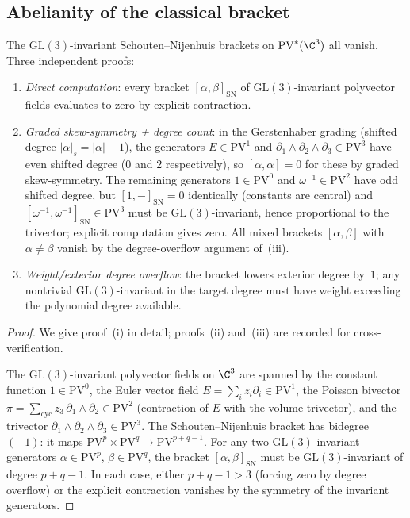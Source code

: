 \subsection{Abelianity of the classical bracket}
\label{subsec:abelian-bracket}

\begin{theorem}
\label{thm:c3-abelian-bracket}
The $\mathrm{GL}(3)$-invariant Schouten--Nijenhuis brackets on $\mathrm{PV}^*(\C^3)$ all vanish. Three independent proofs:
\begin{enumerate}[label=\textup{(\roman*)}]
 \item \emph{Direct computation}: every bracket $[\alpha, \beta]_{\mathrm{SN}}$ of $\mathrm{GL}(3)$-invariant polyvector fields evaluates to zero by explicit contraction.
 \item \emph{Graded skew-symmetry + degree count}: in the Gerstenhaber grading (shifted degree $|\alpha|_s = |\alpha| - 1$), the generators $E \in \mathrm{PV}^1$ and $\partial_1 \wedge \partial_2 \wedge \partial_3 \in \mathrm{PV}^3$ have even shifted degree ($0$ and $2$ respectively), so $[\alpha, \alpha] = 0$ for these by graded skew-symmetry. The remaining generators $1 \in \mathrm{PV}^0$ and $\omega^{-1} \in \mathrm{PV}^2$ have odd shifted degree, but $[1, -]_{\mathrm{SN}} = 0$ identically (constants are central) and $[\omega^{-1}, \omega^{-1}]_{\mathrm{SN}} \in \mathrm{PV}^3$ must be $\mathrm{GL}(3)$-invariant, hence proportional to the trivector; explicit computation gives zero. All mixed brackets $[\alpha, \beta]$ with $\alpha \neq \beta$ vanish by the degree-overflow argument of~(iii).
 \item \emph{Weight/exterior degree overflow}: the bracket lowers exterior degree by~$1$; any nontrivial $\mathrm{GL}(3)$-invariant in the target degree must have weight exceeding the polynomial degree available.
\end{enumerate}
\end{theorem}

\begin{proof}
We give proof~(i) in detail; proofs~(ii) and~(iii) are recorded for cross-verification.

The $\mathrm{GL}(3)$-invariant polyvector fields on $\C^3$ are spanned by the constant function $1 \in \mathrm{PV}^0$, the Euler vector field $E = \sum_i z_i \partial_i \in \mathrm{PV}^1$, the Poisson bivector $\pi = \sum_{\mathrm{cyc}} z_3\, \partial_1 \wedge \partial_2 \in \mathrm{PV}^2$ (contraction of $E$ with the volume trivector), and the trivector $\partial_1 \wedge \partial_2 \wedge \partial_3 \in \mathrm{PV}^3$. The Schouten--Nijenhuis bracket has bidegree $(-1)$: it maps $\mathrm{PV}^p \times \mathrm{PV}^q \to \mathrm{PV}^{p+q-1}$. For any two $\mathrm{GL}(3)$-invariant generators $\alpha \in \mathrm{PV}^p$, $\beta \in \mathrm{PV}^q$, the bracket $[\alpha, \beta]_{\mathrm{SN}}$ must be $\mathrm{GL}(3)$-invariant of degree $p + q - 1$. In each case, either $p + q - 1 > 3$ (forcing zero by degree overflow) or the explicit contraction vanishes by the symmetry of the invariant generators.
\end{proof}


